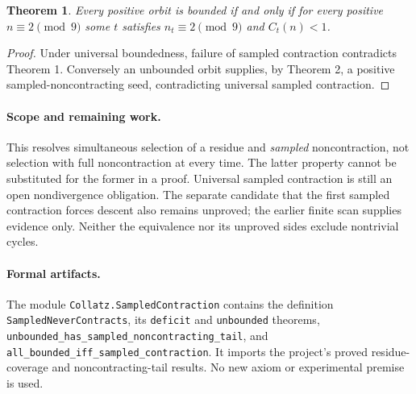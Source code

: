 \documentclass[10pt]{article}
\newtheorem{theorem}{Theorem}
\begin{document}
\begin{theorem}
Every positive orbit is bounded if and only if for every positive
$n\equiv2\pmod9$ some $t$ satisfies $n_t\equiv2\pmod9$ and $C_t(n)<1$.
\end{theorem}
\begin{proof}
Under universal boundedness, failure of sampled contraction contradicts
Theorem 1. Conversely an unbounded orbit supplies, by Theorem 2, a
positive sampled-noncontracting seed, contradicting universal sampled
contraction.
\end{proof}

\paragraph{Scope and remaining work.}
This resolves simultaneous selection of a residue and \emph{sampled}
noncontraction, not selection with full noncontraction at every time.
The latter property cannot be substituted for the former in a proof.
Universal sampled contraction is still an open nondivergence obligation.
The separate candidate that the first sampled contraction forces descent
also remains unproved; the earlier finite scan supplies evidence only.
Neither the equivalence nor its unproved sides exclude nontrivial cycles.

\raggedright
\paragraph{Formal artifacts.}
The module \texttt{Collatz.SampledContraction} contains the definition
\texttt{SampledNeverContracts}, its \texttt{deficit} and \texttt{unbounded}
theorems, \texttt{unbounded\_has\_sampled\_noncontracting\_tail}, and
\texttt{all\_bounded\_iff\_sampled\_contraction}. It imports the project's
proved residue-coverage and noncontracting-tail results. No new axiom or
experimental premise is used.
\end{document}
